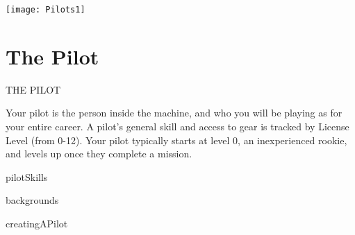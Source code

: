\newpage
\begin{center}
    \texttt{[image: Pilots1]}
\end{center}

\chapter{The Pilot}
  THE PILOT

Your pilot is the person inside the machine, and who you will be playing as for your entire career.
A pilot’s general skill and access to gear is tracked by License Level (from 0-12). Your pilot
typically starts at level 0, an inexperienced rookie, and levels up once they complete a
mission.


{pilotSkills}

{backgrounds}

{creatingAPilot}